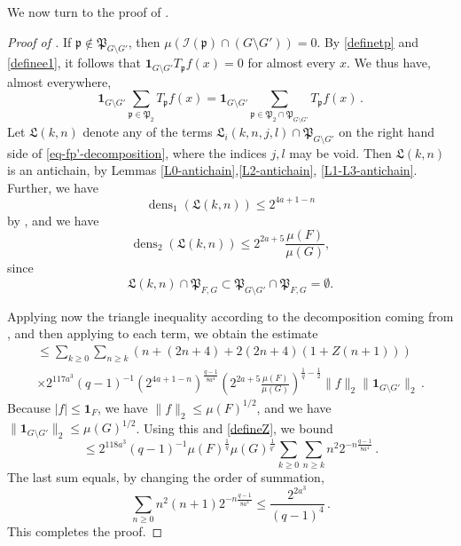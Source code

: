\documentclass[10pt,a4paper]{article}
\theoremstyle{plain}
\theoremstyle{definition}
\numberwithin{equation}{subsection}
\DeclareMathOperator{\dens}{\operatorname{dens}}
\newcommand{\fp}{{\mathfrak p}}
\newcommand{\fP}{{\mathfrak P}}
\newcommand{\fL}{{\mathfrak L}}
\newcommand{\scI}{{\mathcal{I}}} %
\newcommand{\proves}[1]{}
\newcommand{\leanok}{}
\begin{document}
We now turn to the proof of .
\begin{proof}[Proof of ]
    \proves{forest-complement}\leanok
    If $\fp \not\in \fP_{G \setminus G'}$, then $\mu(\scI(\fp) \cap (G \setminus G')) = 0$. By \eqref{definetp} and \eqref{definee1}, it follows that
    $\mathbf{1}_{G \setminus G'} T_{\fp}f(x) = 0$ for almost every $x$. We thus have, almost everywhere,
    $$
        \mathbf{1}_{G\setminus G'} \sum_{\fp \in \fP_2} T_{\fp}f(x) = \mathbf{1}_{G\setminus G'} \sum_{\fp \in \fP_2 \cap \fP_{G \setminus G'}} T_{\fp}f(x)\,.
    $$
    Let $\fL(k,n)$ denote any of the terms $\fL_i(k,n,j,l) \cap \fP_{G \setminus G'}$ on the right hand side of \eqref{eq-fp'-decomposition}, where the indices $j, l$ may be void. Then $\fL(k,n)$ is an antichain, by Lemmas \ref{L0-antichain},\ref{L2-antichain}, \ref{L1-L3-antichain}. Further, we have
    \begin{equation*}
    \dens_1(\fL(k,n)) \le 2^{4a+1 - n}
    \end{equation*}
    by , and we have
    \begin{equation*}
     \dens_2(\fL(k,n)) \le 2^{2a+5} \frac{\mu(F)}{\mu(G)},
     \end{equation*}
     since
     \begin{equation*}
     \fL(k,n) \cap \fP_{F,G} \subset \fP_{G \setminus G'} \cap \fP_{F, G} = \emptyset.
     \end{equation*}

    Applying now the triangle inequality according to the decomposition coming from , and then applying  to each term, we obtain the estimate
    \begin{multline*}
        \le \sum_{k \ge 0} \sum_{n \ge k} (n + (2n+4) + 2(2n+4) (1+Z(n+1))) \\
        \times 2^{117a^3}(q-1)^{-1} (2^{4a+1-n})^{\frac{q-1}{8a^4}} (2^{2a+5} \frac{\mu(F)}{\mu(G)})^{\frac{1}{q} - \frac{1}{2}} \|f\|_2\|\mathbf{1}_{G\setminus G'}\|_2\,.
    \end{multline*}
    Because $|f| \le \mathbf{1}_F$, we have $\|f\|_2 \le \mu(F)^{1/2}$, and we have $\|\mathbf{1}_{G\setminus G'}\|_2 \le \mu(G)^{1/2}$. Using this and \eqref{defineZ}, we bound
    $$
        \le 2^{118a^3} (q - 1)^{-1} \mu(F)^{\frac{1}{q}} \mu(G)^{\frac{1}{q'}} \sum_{k \ge 0} \sum_{n \ge k} n^2 2^{-n\frac{q-1}{8a^4}}\,.
    $$
    The last sum equals, by changing the order of summation,
    $$
        \sum_{n \ge 0} n^2(n+1) 2^{-n\frac{q-1}{8a^4}} \le \frac{2^{2a^3}}{(q-1)^4}\,.
    $$
    This completes the proof.
\end{proof}
\end{document}
